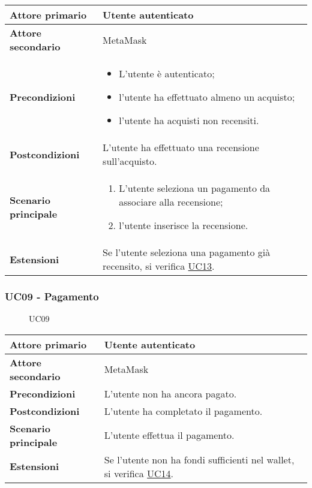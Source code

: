 \begin{center}
\renewcommand{\arraystretch}{1.5}
\begin{tabular}{ | m{10em} | m{20em} | }
    \hline
    \textbf{Attore primario} & Utente autenticato \\
    \hline
    \textbf{Attore secondario} & MetaMask \\
    \hline
    \textbf{Precondizioni} & \begin{itemize}
        \item L'utente è autenticato;
        \item l'utente ha effettuato almeno un acquisto;
        \item l'utente ha acquisti non recensiti.
    \end{itemize} \\
    \hline
    \textbf{Postcondizioni} & L'utente ha effettuato una recensione sull'acquisto. \\
    \hline
    \textbf{Scenario principale} & \begin{enumerate}
        \item L'utente seleziona un pagamento da associare alla recensione;
        \item l'utente inserisce la recensione.
    \end{enumerate} \\
    \hline
    \textbf{Estensioni} & Se l'utente seleziona una pagamento già recensito, si verifica \hyperref[UC13]{UC13}. \\
    \hline
   \end{tabular}
\end{center}

\subsubsection{UC09 - Pagamento}
\label{UC09}

\begin{figure}[H]
    \centering
    
    \caption{UC09}
 \end{figure}

\begin{center}
\renewcommand{\arraystretch}{1.5}
\begin{tabular}{ | m{10em} | m{20em} | }
    \hline
    \textbf{Attore primario} & Utente autenticato \\
    \hline
    \textbf{Attore secondario} & MetaMask \\
    \hline
    \textbf{Precondizioni} & L'utente non ha ancora pagato. \\
    \hline
    \textbf{Postcondizioni} & L'utente ha completato il pagamento. \\
    \hline
    \textbf{Scenario principale} & L'utente effettua il pagamento. \\
    \hline
    \textbf{Estensioni} & Se l'utente non ha fondi sufficienti nel wallet, si verifica \hyperref[UC14]{UC14}.\\
    \hline
   \end{tabular}
\end{center}

